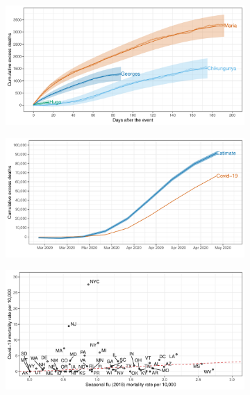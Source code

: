 \documentclass[11pt]{article}
\begin{document}
\begin{figure}[ht]
	\centering
	\begin{subfigure}[t]{0.49\linewidth}
		\centering
		\includegraphics[width=1\linewidth]{figs/figure-2a.pdf} 
		\caption{} 
		\label{fig:excess-pr}
	\end{subfigure}
	\hfill
	\begin{subfigure}[t]{0.49\linewidth}
		\centering
		\includegraphics[width=1\linewidth]{figs/figure-2b.pdf}
		\caption{} 
		\label{fig:excess-usa}
	\end{subfigure}
	\hfill
	\begin{subfigure}[t]{0.49\linewidth}
		\centering
		\includegraphics[width=1\linewidth]{figs/figure-2c.pdf}

\end{subfigure}
\end{figure}
\end{document}
